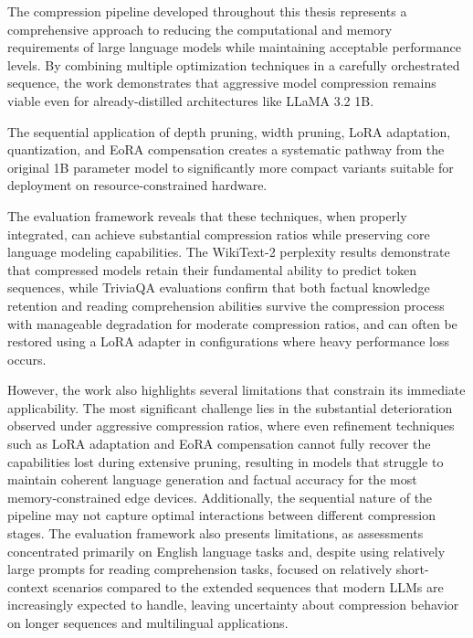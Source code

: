 
The compression pipeline developed throughout this thesis represents a comprehensive approach to reducing the computational and memory requirements of large language models while maintaining acceptable performance levels. By combining multiple optimization techniques in a carefully orchestrated sequence, the work demonstrates that aggressive model compression remains viable even for already-distilled architectures like LLaMA 3.2 1B.

The sequential application of depth pruning, width pruning, LoRA adaptation, quantization, and EoRA compensation creates a systematic pathway from the original 1B parameter model to significantly more compact variants suitable for deployment on resource-constrained hardware.

The evaluation framework reveals that these techniques, when properly integrated, can achieve substantial compression ratios while preserving core language modeling capabilities. The WikiText-2 perplexity results demonstrate that compressed models retain their fundamental ability to predict token sequences, while TriviaQA evaluations confirm that both factual knowledge retention and reading comprehension abilities survive the compression process with manageable degradation for moderate compression ratios, and can often be restored using a LoRA adapter in configurations where heavy performance loss occurs.

However, the work also highlights several limitations that constrain its immediate applicability. The most significant challenge lies in the substantial deterioration observed under aggressive compression ratios, where even refinement techniques such as LoRA adaptation and EoRA compensation cannot fully recover the capabilities lost during extensive pruning, resulting in models that struggle to maintain coherent language generation and factual accuracy for the most memory-constrained edge devices. Additionally, the sequential nature of the pipeline may not capture optimal interactions between different compression stages. The evaluation framework also presents limitations, as assessments concentrated primarily on English language tasks and, despite using relatively large prompts for reading comprehension tasks, focused on relatively short-context scenarios compared to the extended sequences that modern LLMs are increasingly expected to handle, leaving uncertainty about compression behavior on longer sequences and multilingual applications.

